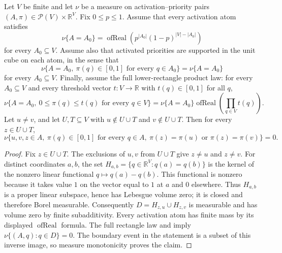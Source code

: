 \begin{helper}
Let \(V\) be finite and let \(\nu\) be a measure on activation--priority
pairs \((A,\pi)\in\mathcal P(V)\times\mathbb R^V\).  Fix
\(0\le p\le1\).  Assume that every activation atom satisfies
\[
\nu\{A=A_0\}=
\operatorname{ofReal}\!\left(p^{|A_0|}(1-p)^{|V|-|A_0|}\right)
\]
for every \(A_0\subseteq V\).  Assume also that activated priorities are
supported in the unit cube on each atom, in the sense that
\[
\nu\{A=A_0,\ \pi(q)\in[0,1]\text{ for every }q\in A_0\}
=\nu\{A=A_0\}
\]
for every \(A_0\subseteq V\).  Finally, assume the full lower-rectangle
product law: for every \(A_0\subseteq V\) and every threshold vector
\(t:V\to\mathbb R\) with \(t(q)\in[0,1]\) for all \(q\),
\[
\nu\{A=A_0,\ 0\le \pi(q)\le t(q)\text{ for every }q\in V\}
=\nu\{A=A_0\}\operatorname{ofReal}\!\left(\prod_{q\in V}t(q)\right).
\]
Let \(u\ne v\), and let \(U,T\subseteq V\) with
\(u\notin U\cup T\) and \(v\notin U\cup T\).  Then for every \(z\in U\cup T\),
\[
\nu\{u,v,z\in A,\ \pi(q)\in[0,1]\text{ for every }q\in A,\
\pi(z)=\pi(u)\text{ or }\pi(z)=\pi(v)\}=0 .
\]
\end{helper}
\begin{proof}
Fix \(z\in U\cup T\). The exclusions of \(u,v\) from \(U\cup T\)
give \(z\ne u\) and \(z\ne v\).
For distinct coordinates \(a,b\), the set
\(H_{a,b}=\{q\in\mathbb R^V:q(a)=q(b)\}\) is the kernel of the
nonzero linear functional \(q\mapsto q(a)-q(b)\).
This functional is nonzero because it takes value \(1\) on the vector
equal to \(1\) at \(a\) and \(0\) elsewhere. Thus \(H_{a,b}\) is a
proper linear subspace, hence has Lebesgue volume zero; it is closed
and therefore Borel measurable.
Consequently \(D=H_{z,u}\cup H_{z,v}\) is measurable and has volume
zero by finite subadditivity.
Every activation atom has finite mass by its displayed
\(\operatorname{ofReal}\) formula. The full rectangle law and
 imply
\(\nu\{(A,q):q\in D\}=0\).
The boundary event in the statement is a subset of this inverse image,
so measure monotonicity proves the claim.
\end{proof}
